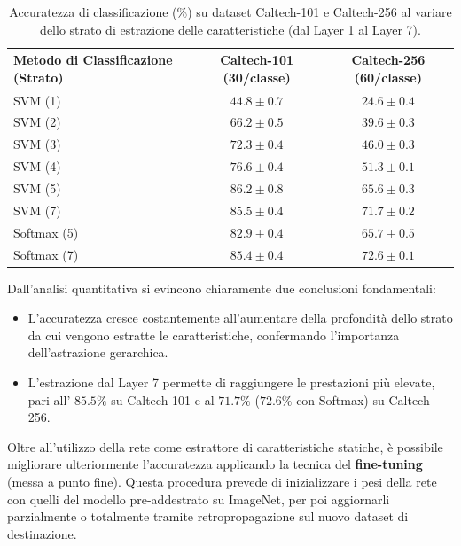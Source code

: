 ﻿\documentclass[11pt, a4paper]{article}
\begin{document}
\begin{table}[H]
\centering
\caption{Accuratezza di classificazione (\%) su dataset Caltech-101 e Caltech-256 al variare dello strato di estrazione delle caratteristiche (dal Layer 1 al Layer 7).}
\label{tab:feature_extraction_results}
\vspace{0.2cm}
\begin{tabular}{lcc}
\toprule
\textbf{Metodo di Classificazione (Strato)} & \textbf{Caltech-101 (30/classe)} & \textbf{Caltech-256 (60/classe)} \\
\midrule
SVM (1)     & $44.8 \pm 0.7$ & $24.6 \pm 0.4$ \\
SVM (2)     & $66.2 \pm 0.5$ & $39.6 \pm 0.3$ \\
SVM (3)     & $72.3 \pm 0.4$ & $46.0 \pm 0.3$ \\
SVM (4)     & $76.6 \pm 0.4$ & $51.3 \pm 0.1$ \\
SVM (5)     & $86.2 \pm 0.8$ & $65.6 \pm 0.3$ \\
SVM (7)     & $85.5 \pm 0.4$ & $71.7 \pm 0.2$ \\
\midrule
Softmax (5) & $82.9 \pm 0.4$ & $65.7 \pm 0.5$ \\
Softmax (7) & $85.4 \pm 0.4$ & $72.6 \pm 0.1$ \\
\bottomrule
\end{tabular}
\end{table}

Dall'analisi quantitativa si evincono chiaramente due conclusioni fondamentali:
\begin{itemize}
    \item L'accuratezza cresce costantemente all'aumentare della profondità dello strato da cui vengono estratte le caratteristiche, confermando l'importanza dell'astrazione gerarchica.
    \item L'estrazione dal Layer 7 permette di raggiungere le prestazioni più elevate, pari all' $85.5\%$ su Caltech-101 e al $71.7\%$ ($72.6\%$ con Softmax) su Caltech-256.
\end{itemize}

Oltre all'utilizzo della rete come estrattore di caratteristiche statiche, è possibile migliorare ulteriormente l'accuratezza applicando la tecnica del \textbf{fine-tuning} (messa a punto fine). Questa procedura prevede di inizializzare i pesi della rete con quelli del modello pre-addestrato su ImageNet, per poi aggiornarli parzialmente o totalmente tramite retropropagazione sul nuovo dataset di destinazione.

\newpage
\end{document}
